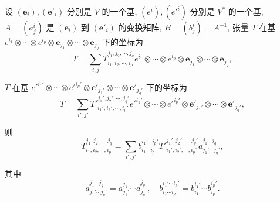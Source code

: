 \documentclass{ctexart}
\begin{document}
\begin{theorem}[书上的定理 2]
    设 $(\boldsymbol{e}_i),(\boldsymbol{e}'_i)$ 分别是 $V$ 的一个基, $(e^i),(e'^i)$ 分别是 $V^*$ 的一个基, $A=(a^i_j)$ 是 $(\boldsymbol{e}_i)$ 到 $(\boldsymbol{e}'_i)$ 的变换矩阵, $B=(b^i_j)=A^{-1}$, 张量 $T$ 在基 $e^{i_1}\otimes\cdots\otimes e^{i_p}\otimes\boldsymbol{e}_{j_1}\otimes\cdots\otimes\boldsymbol{e}_{j_q}$ 下的坐标为
    \[T=\sum\limits_{i,j}T^{j_1,j_2,\cdots,j_q}_{i_1,i_2,\cdots,i_p}e^{i_1}\otimes\cdots\otimes e^{i_p}\otimes\boldsymbol{e}_{j_1}\otimes\cdots\otimes\boldsymbol{e}_{j_q},\]


    $T$ 在基 $e'^{i_1'}\otimes\cdots\otimes e'^{i_p'}\otimes\boldsymbol{e}'_{j_1'}\otimes\cdots\otimes\boldsymbol{e}'_{j_q'}$ 下的坐标为
    \begin{equation}\label{eq1.1}
        T=\sum\limits_{i',j'}T'^{j_1',j_2',\cdots,j_q'}_{i_1',i_2',\cdots,i_p'}e'^{i_1'}\otimes\cdots\otimes e'^{i_p'}\otimes\boldsymbol{e}'_{j_1'}\otimes\cdots\otimes\boldsymbol{e}'_{j_q'},
    \end{equation}

    则
    \[T^{j_1,j_2,\cdots,j_q}_{i_1,i_2,\cdots,i_p}=\sum\limits_{i',j'}b^{i_1'\cdots i_p'}_{i_1\cdots i_p}T'^{j_1',j_2',\cdots,j_q'}_{i_1',i_2',\cdots,i_p'}a^{j_1\cdots j_q}_{j_1'\cdots j_q'},\]

    其中
    \[a^{j_1\cdots j_q}_{j_1'\cdots j_q'}=a^{j_1}_{j_1'}\cdots a^{j_q}_{j_q'},\quad b^{i_1'\cdots i_p'}_{i_1\cdots i_p}=b^{i_1'}_{i_1}\cdots b^{i_p'}_{i_p}.\]
\end{theorem}
\end{document}
